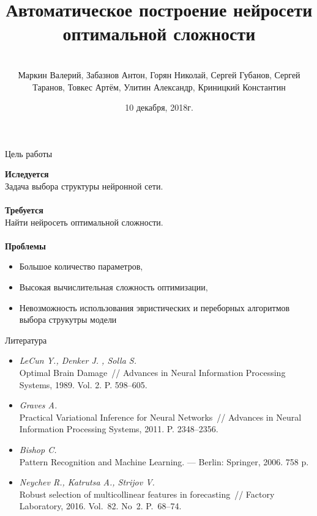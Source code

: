 \documentclass[10pt]{beamer}
\title[\hbox to 56mm{Нейросети оптимальной сложности  \hfill\insertframenumber\,/\,\inserttotalframenumber}]
{Автоматическое построение нейросети оптимальной сложности }
\author[В.\,О. Маркин, А.\,Г. Забазнов, Н.\,А. Горян, С.\,Е. Губанов, С.\,К. Таранов]{\large \\Маркин Валерий, Забазнов Антон, Горян Николай, Сергей Губанов, Сергей Таранов, Товкес Артём, Улитин Александр, Криницкий Константин}
\institute{\large
Московский физико-технический институт}
\date{\footnotesize{10 декабря, 2018г.}}
\begin{document}
\begin{frame}
\titlepage
\end{frame}
\begin{frame}{Цель работы}

{\bf Иследуется}\\
\quad
	 Задача выбора структуры нейронной сети.\\
	~\\

{\bf Требуется}\\
\quad
	Найти нейросеть оптимальной сложности.\\
	~\\

{\bf Проблемы}\\
	\begin{itemize}
		\item Большое количество параметров,
		\item Высокая вычислительная сложность оптимизации,
		\item Невозможность использования эвристических и переборных алгоритмов выбора струкутры модели
	\end{itemize}

\end{frame}

\begin{frame}{Литература}

	\begin{itemize}
		\item \textit{LeCun Y., Denker J. , Solla S.}\\ Optimal Brain Damage~// Advances in Neural Information Processing Systems, 1989. Vol. 2. P. 598--605.
		\item	\textit{Graves A.}\\ Practical Variational Inference for Neural Networks~// Advances in Neural Information Processing Systems, 2011. P. 2348--2356.
	\end{itemize}
	
	\begin{itemize}
		\item \textit{Bishop C.}\\ Pattern Recognition and Machine Learning. --- Berlin: Springer, 2006. 758 p.
		\item \textit{Neychev R., Katrutsa A., Strijov V.}\\ Robust selection of multicollinear features in forecasting~// Factory Laboratory, 2016. Vol.~82. No~2. P.~68--74.		
	\end{itemize}
	
\end{frame}
\end{document}
